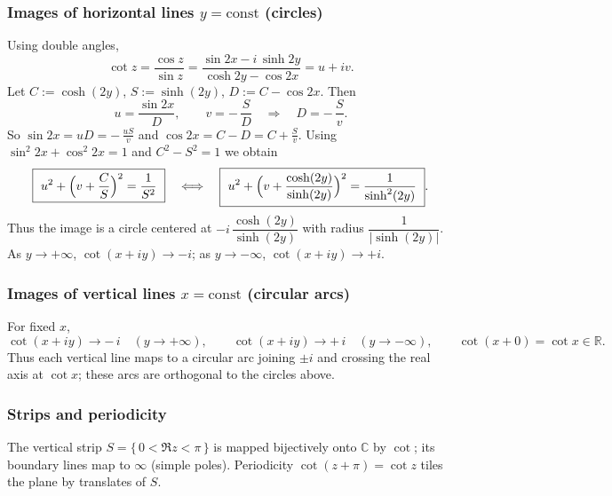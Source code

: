 \documentclass[11pt,a4paper]{article}
\theoremstyle{definition}
\theoremstyle{definition}
\theoremstyle{plain}
\theoremstyle{remark}
\begin{document}
\medskip
\subsubsection*{Images of horizontal lines $y=\mathrm{const}$ (circles)}
Using double angles,
\[
\cot z=\frac{\cos z}{\sin z}
=\frac{\sin 2x - i\,\sinh 2y}{\cosh 2y - \cos 2x}=u+iv.
\]
Let $C:=\cosh(2y)$, $S:=\sinh(2y)$, $D:=C-\cos 2x$. Then
\[
u=\frac{\sin 2x}{D},\qquad v=-\,\frac{S}{D}\quad\Rightarrow\quad D=-\,\frac{S}{v}.
\]
So $\sin 2x=uD=-\,\frac{uS}{v}$ and $\cos 2x=C-D=C+\frac{S}{v}$. Using
$\sin^{2}2x+\cos^{2}2x=1$ and $C^{2}-S^{2}=1$ we obtain
\[
\boxed{\ u^{2}+\Bigl(v+\frac{C}{S}\Bigr)^{2}=\frac{1}{S^{2}}\ }
\quad\Longleftrightarrow\quad
\boxed{\ u^{2}+\Bigl(v+\frac{\cosh(2y)}{\sinh(2y)}\Bigr)^{2}=\frac{1}{\sinh^{2}(2y)}\ }.
\]
Thus the image is a circle centered at $-i\,\dfrac{\cosh(2y)}{\sinh(2y)}$
with radius $\dfrac{1}{|\sinh(2y)|}$. As $y\to+\infty$, $\cot(x+iy)\to -i$;
as $y\to-\infty$, $\cot(x+iy)\to +i$.

\medskip
\subsubsection*{Images of vertical lines $x=\mathrm{const}$ (circular arcs)}
For fixed $x$,
\[
\cot(x+iy)\to -\,i\quad (y\to+\infty),\qquad
\cot(x+iy)\to +\,i\quad (y\to-\infty),\qquad
\cot(x+0)=\cot x\in\mathbb{R}.
\]
Thus each vertical line maps to a circular arc joining $\pm i$ and crossing the real axis
at $\cot x$; these arcs are orthogonal to the circles above.

\medskip
\subsubsection*{Strips and periodicity}
The vertical strip $S=\{\,0<\Re z<\pi\,\}$ is mapped bijectively onto $\mathbb{C}$ by $\cot$;
its boundary lines map to $\infty$ (simple poles). Periodicity $\cot(z+\pi)=\cot z$
tiles the plane by translates of $S$.


	
\end{document}
